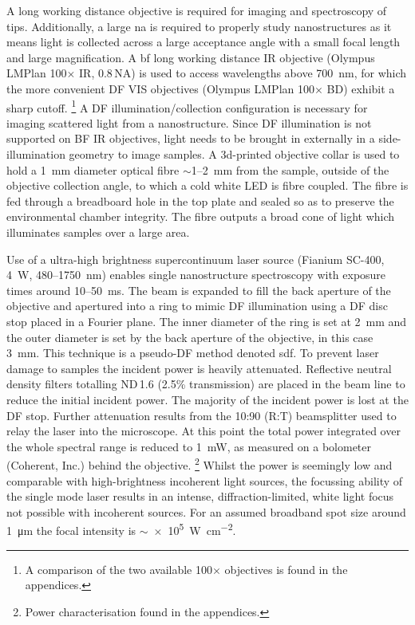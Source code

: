 \documentclass{article}
\begin{document}
A long working distance objective is required for imaging and spectroscopy of tips. Additionally, a large \gls{na} is required to properly study nanostructures as it means light is collected across a large acceptance angle with a small focal length and large magnification. A \gls{bf} long working distance IR objective (Olympus LMPlan 100$\times$ IR, 0.8\,NA) is used to access wavelengths above \SI{700}{nm}, for which the more convenient DF VIS objectives (Olympus LMPlan 100$\times$ BD) exhibit a sharp cutoff.%
\footnote{A comparison of the two available 100$\times$ objectives is found in the appendices.}
A DF illumination/collection configuration is necessary for imaging scattered light from a nanostructure. Since DF illumination is not supported on BF IR objectives, light needs to be brought in externally in a side-illumination geometry to image samples. A 3d-printed objective collar is used to hold a \SI{1}{mm} diameter optical fibre $\sim$1--\SI{2}{mm} from the sample, outside of the objective collection angle, to which a cold white LED is fibre coupled. The fibre is fed through a breadboard hole in the top plate and sealed so as to preserve the environmental chamber integrity. The fibre outputs a broad cone of light which illuminates samples over a large area.

Use of a ultra-high brightness supercontinuum laser source (Fianium SC-400, \SI{4}{W}, 480--\SI{1750}{nm}) enables single nanostructure spectroscopy with exposure times around 10--\SI{50}{ms}. The beam is expanded to fill the back aperture of the objective and apertured into a ring to mimic DF illumination using a DF disc stop placed in a Fourier plane. The inner diameter of the ring is set at \SI{2}{mm} and the outer diameter is set by the back aperture of the objective, in this case \SI{3}{mm}. This technique is a pseudo-DF method denoted \gls{sdf}. %
To prevent laser damage to samples the incident power is heavily attenuated. Reflective neutral density filters totalling ND\,1.6 (2.5\% transmission) are placed in the beam line to reduce the initial incident power. The majority of the incident power is lost at the DF stop. Further attenuation results from the 10:90 (R:T) beamsplitter used to relay the laser into the microscope. At this point the total power integrated over the whole spectral range is reduced to \SI{1}{mW}, as measured on a bolometer (Coherent, Inc.) behind the objective.%
\footnote{Power characterisation found in the appendices.}
Whilst the power is seemingly low and comparable with high-brightness incoherent light sources, the focussing ability of the single mode laser results in an intense, diffraction-limited, white light focus not possible with incoherent sources. For an assumed broadband spot size around \SI{1}{\micro\metre} the focal intensity is $\sim${\SI{e5}{\watt\per\centi\metre\squared}}.
\end{document}
